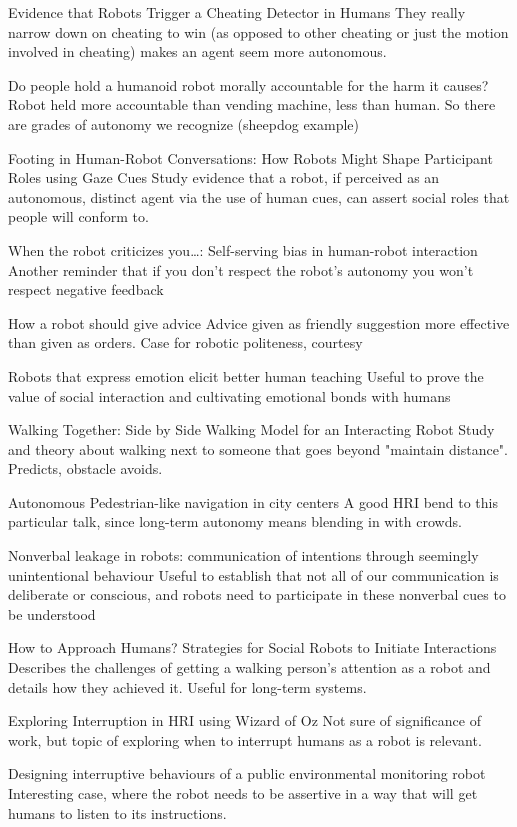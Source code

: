 \documentclass{sfuthesis}
\begin{document}
Evidence that Robots Trigger a Cheating Detector in Humans	They really narrow down on cheating to win (as opposed to other cheating or just the motion involved in cheating) makes an agent seem more autonomous.	

Do people hold a humanoid robot morally accountable for the harm it causes?	Robot held more accountable than vending machine, less than human. So there are grades of autonomy we recognize (sheepdog example)	

Footing in Human-Robot Conversations: How Robots Might Shape Participant Roles using Gaze Cues	Study evidence that a robot, if perceived as an autonomous, distinct agent via the use of human cues, can assert social roles that people will conform to.	

When the robot criticizes you…: Self-serving bias in human-robot interaction	Another reminder that if you don't respect the robot's autonomy you won't respect negative feedback	

How a robot should give advice	Advice given as friendly suggestion more effective than given as orders. Case for robotic politeness, courtesy	

Robots that express emotion elicit better human teaching	Useful to prove the value of social interaction and cultivating emotional bonds with humans	

Walking Together: Side by Side Walking Model for an Interacting Robot	Study and theory about walking next to someone that goes beyond "maintain distance". Predicts, obstacle avoids.	

Autonomous Pedestrian-like navigation in city centers	A good HRI bend to this particular talk, since long-term autonomy means blending in with crowds.	

Nonverbal leakage in robots: communication of intentions through seemingly unintentional behaviour	Useful to establish that not all of our communication is deliberate or conscious, and robots need to participate in these nonverbal cues to be understood	

How to Approach Humans? Strategies for Social Robots to Initiate Interactions	Describes the challenges of getting a walking person's attention as a robot and details how they achieved it. Useful for long-term systems.	

Exploring Interruption in HRI using Wizard of Oz	Not sure of significance of work, but topic of exploring when to interrupt humans as a robot is relevant.	

Designing interruptive behaviours of a public environmental monitoring robot	Interesting case, where the robot needs to be assertive in a way that will get humans to listen to its instructions.	
\end{document}
